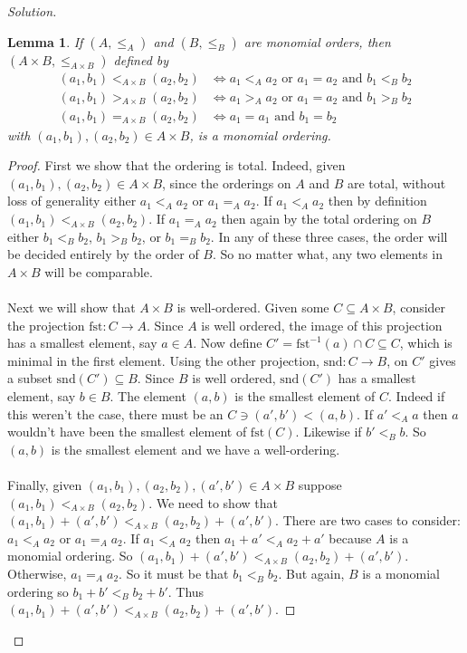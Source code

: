\documentclass[]{article}
\newtheorem{lemma}{Lemma}
\newcommand\<{\langle}
\renewcommand\>{\rangle}
\newenvironment{solution}
{
	\begin{proof}[Solution] \text{ }
		\\
	}
	{
	\end{proof}
}
\begin{document}
\begin{solution}

	\begin{lemma}
		If $(A, \leq_A)$ and $(B, \leq_B)$ are monomial orders, then $(A \times B, \leq_{A\times B})$ defined by
		\begin{align*}
			(a_1, b_1) <_{A \times B} (a_2, b_2) &\iff a_1 <_A a_2 \text{ or } a_1 = a_2 \text{ and } b_1 <_B b_2 \\
			(a_1, b_1) >_{A \times B} (a_2, b_2) &\iff a_1 >_A a_2 \text{ or } a_1 = a_2 \text{ and } b_1 >_B b_2 \\
			(a_1, b_1) =_{A \times B} (a_2, b_2) &\iff a_1 = a_1 \text{ and } b_1 = b_2
		\end{align*}
		with $(a_1, b_1), (a_2, b_2) \in A \times B$, is a monomial ordering.
	\end{lemma}
	\begin{proof}
		First we show that the ordering is total. Indeed, given $(a_1, b_1), (a_2, b_2) \in A \times B$, since the orderings on $A$ and $B$ are total, without loss of generality either $a_1 <_A a_2$ or $a_1 =_A a_2$. If $a_1 <_A a_2$ then by definition $(a_1, b_1) <_{A \times B} (a_2, b_2)$. If $a_1 =_A a_2$ then again by the total ordering on $B$ either $b_1 <_B b_2$, $b_1 >_B b_2$, or $b_1 =_B b_2$. In any of these three cases, the order will be decided entirely by the order of $B$. So no matter what, any two elements in $A \times B$ will be comparable. 
		\\
		\\
		Next we will show that $A \times B$ is well-ordered. Given some $C \subseteq A \times B$, consider the projection $\text{fst} : C \to A$. Since $A$ is well ordered, the image of this projection has a smallest element, say $a \in A$. Now define $C' = \text{fst}^{-1}(a) \cap C \subseteq C$, which is minimal in the first element. Using the other projection, $\text{snd} : C \to B$, on $C'$ gives a subset $\text{snd}(C') \subseteq B$. Since $B$ is well ordered, $\text{snd}(C')$ has a smallest element, say $b \in B$. The element $(a, b)$ is the smallest element of $C$. Indeed if this weren't the case, there must be an $C \ni (a', b') < (a, b)$. If $a' <_A a$ then $a$ wouldn't have been the smallest element of $\text{fst}(C)$. Likewise if $b' <_B b$. So $(a, b)$ is the smallest element and we have a well-ordering. 
		\\
		\\
		Finally, given $(a_1, b_1), (a_2, b_2), (a', b') \in A \times B$ suppose $(a_1, b_1) <_{A \times B} (a_2, b_2)$. We need to show that $(a_1, b_1) + (a', b') <_{A \times B} (a_2, b_2) + (a', b')$. There are two cases to consider: $a_1 <_A a_2$ or $a_1 =_A a_2$. If $a_1 <_A a_2$ then $a_1 + a' <_A a_2 + a'$ because $A$ is a monomial ordering. So $(a_1, b_1) + (a', b') <_{A \times B} (a_2, b_2) + (a', b')$. Otherwise, $a_1 =_A a_2$. So it must be that $b_1 <_B b_2$. But again, $B$ is a monomial ordering so $b_1 + b' <_B b_2 + b'$. Thus $(a_1, b_1) + (a', b') <_{A \times B} (a_2, b_2) + (a', b')$.

\end{proof}
\end{solution}
\end{document}
